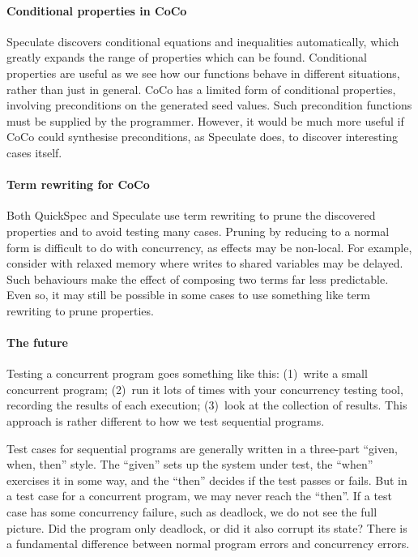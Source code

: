 \paragraph{Conditional properties in CoCo}
Speculate\cite{braquehais2017} discovers conditional equations and
inequalities automatically, which greatly expands the range of
properties which can be found.  Conditional properties are useful as
we see how our functions behave in different situations, rather than
just in general.  CoCo has a limited form of conditional properties,
involving preconditions on the generated seed values.  Such
precondition functions must be supplied by the programmer.  However,
it would be much more useful if CoCo could synthesise preconditions,
as Speculate does, to discover interesting cases itself.

\paragraph{Term rewriting for CoCo}
Both QuickSpec\cite{smallbone2017} and Speculate\cite{braquehais2017}
use term rewriting to prune the discovered properties and to avoid
testing many cases.  Pruning by reducing to a normal form is difficult
to do with concurrency, as effects may be non-local.  For example,
consider with relaxed memory where writes to shared variables may be
delayed\cite{zhang2015}.  Such behaviours make the effect of composing
two terms far less predictable.  Even so, it may still be possible in
some cases to use something like term rewriting to prune properties.

\paragraph{The future}
Testing a concurrent program goes something like this: (1)~write a
small concurrent program; (2)~run it lots of times with your
concurrency testing tool, recording the results of each execution;
(3)~look at the collection of results.  This approach is rather
different to how we test sequential programs.

Test cases for sequential programs are generally written in a
three-part ``given, when, then'' style\cite{fowler2013}.  The
``given'' sets up the system under test, the ``when'' exercises it in
some way, and the ``then'' decides if the test passes or fails.  But
in a test case for a concurrent program, we may never reach the
``then''.  If a test case has some concurrency failure, such as
deadlock, we do not see the full picture.  Did the program only
deadlock, or did it also corrupt its state?  There is a fundamental
difference between normal program errors and concurrency errors.

